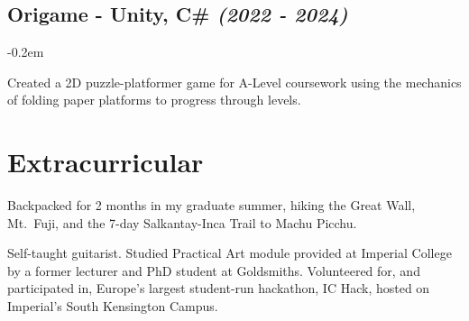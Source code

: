 \documentclass{article}
\newcommand{\dates}[1]{\hfill\textit{(#1)}}
\newcommand{\indentsubsection}[2]{
    \subsection*{#1}
    #2
}
\newcommand{\project}[5]{
    \indentsubsection{\textbf{#1}\textit{#2} - {#4} \dates{#3}}
    \vspace{-0.2em}
    \begin{minipage}{\dimexpr\textwidth}%
        #5
    \end{minipage}
    \vspace{-1.1em}
}
\begin{document}

\project{Origame}{}{2022 - 2024}{Unity, C\#}{
    Created a 2D puzzle-platformer game for A-Level coursework using the mechanics of folding paper platforms to progress through levels.
}



\section*{Extracurricular}

Backpacked for 2 months in my graduate summer, hiking the Great Wall, Mt.\ Fuji, and the 7-day Salkantay-Inca Trail to Machu Picchu.

\vspace{1em}\noindent 
Self-taught guitarist. Studied Practical Art module provided at Imperial College  by a former lecturer and PhD student at Goldsmiths.
Volunteered for, and participated in, Europe's largest student-run hackathon, IC Hack, hosted on Imperial's South Kensington Campus.
\end{document}
